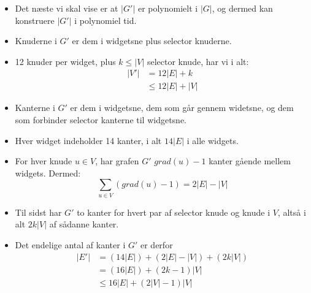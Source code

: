 \begin{frame}[allowframebreaks]
\begin{itemize}
		\item Det næste vi skal vise er at $|G'|$ er polynomielt i $|G|$, og dermed kan konstruere $|G'|$ i polynomiel tid.
		\item Knuderne i $G'$ er dem i widgetsne plus selector knuderne.
		\item 12 knuder per widget, plus $k \le |V|$ selector knude, har vi i alt:
		      \begin{align*}
			      |V'| & = 12 |E| + k     \\
			           & \le 12 |E| + |V|
		      \end{align*}
		\item Kanterne i $G'$ er dem i widgetsne, dem som går gennem widetsne, og dem som forbinder selector kanterne til widgetsne.
		\item Hver widget indeholder 14 kanter, i alt $14|E|$ i alle widgets.
		\item For hver knude $u \in V$, har grafen $G'$ $grad(u)-1$ kanter gående mellem widgets. Dermed:
		      \begin{equation*}
			      \sum_{u \in V} (grad(u) - 1) = 2 |E| - |V|
		      \end{equation*}
		\item Til sidst har $G'$ to kanter for hvert par af selector knude og knude i $V$, altså i alt $2k|V|$ af sådanne kanter.
		\item Det endelige antal af kanter i $G'$ er derfor
		      \begin{align*}
			      |E'| & = (14|E|) + (2|E| - |V|) + (2k|V|) \\
			           & = (16|E|) + (2k-1)|V|              \\
			           & \le 16|E| + (2 |V|-1) |V|
		      \end{align*}


\end{itemize}
\end{frame}
